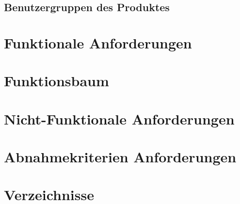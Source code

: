 \documentclass[10pt,a4paper,titlepage,twoside,german]{zhawreprt}
\begin{document}
\section{Benutzergruppen des Produktes}\label{sec:TargetAudience}
\chapter{Funktionale Anforderungen}\label{chp:FunctionalRequirements}
\chapter{Funktionsbaum}\label{chp:FunctionTree}
\chapter{Nicht-Funktionale Anforderungen}\label{chp:NonFunctionalRequirements}
\chapter{Abnahmekriterien Anforderungen}\label{chp:TestRequirements}
\chapter{Verzeichnisse}\label{chp:Index}
\printglossary\label{sec:Glossar}
\newpage
\label{sec:Bibliography}
\end{document}
